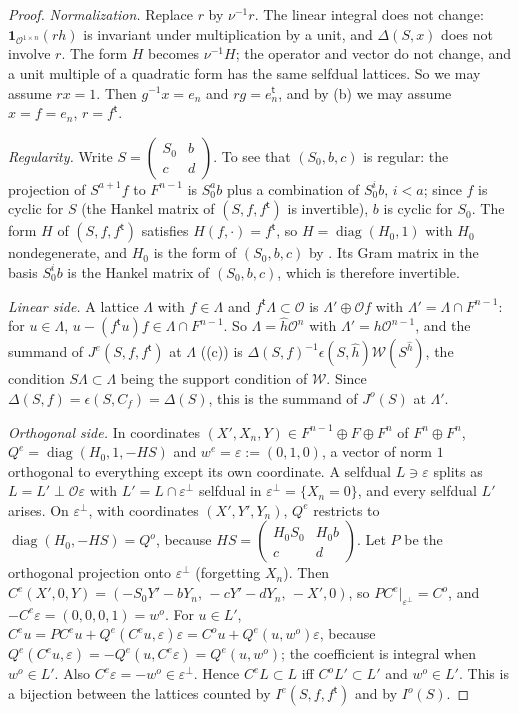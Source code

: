 \documentclass[11pt,oneside,notitlepage]{book}
\numberwithin{equation}{section}
\theoremstyle{plain}
\theoremstyle{definition}
\newcommand{\cO}{\mathcal{O}}
\newcommand{\cW}{\mathcal{W}}
\newcommand{\diag}{\operatorname{diag}}
\newcommand{\one}{\mathbf{1}}
\begin{document}
\begin{proof}
\emph{Normalization.} Replace $r$ by $\nu^{-1}r$. The linear integral does not change: $\one_{\cO^{1\times n}}(rh)$ is invariant under multiplication by a unit, and $\Delta(S,x)$ does not involve $r$. The form $H$ becomes $\nu^{-1}H$; the operator and vector do not change, and a unit multiple of a quadratic form has the same selfdual lattices. So we may assume $rx=1$. Then $g^{-1}x=e_n$ and $rg=e_n^{\mathsf t}$, and by (b) we may assume $x=f=e_n$, $r=f^{\mathsf t}$.

\emph{Regularity.} Write $S=\left(\begin{smallmatrix}S_0&b\\c&d\end{smallmatrix}\right)$. To see that $(S_0,b,c)$ is regular: the projection of $S^{a+1}f$ to $F^{n-1}$ is $S_0^ab$ plus a combination of $S_0^ib$, $i<a$; since $f$ is cyclic for $S$ (the Hankel matrix of $(S,f,f^{\mathsf t})$ is invertible), $b$ is cyclic for $S_0$. The form $H$ of $(S,f,f^{\mathsf t})$ satisfies $H(f,\cdot)=f^{\mathsf t}$, so $H=\diag(H_0,1)$ with $H_0$ nondegenerate, and $H_0$ is the form of $(S_0,b,c)$ by . Its Gram matrix in the basis $S_0^ib$ is the Hankel matrix of $(S_0,b,c)$, which is therefore invertible.

\emph{Linear side.} A lattice $\Lambda$ with $f\in\Lambda$ and $f^{\mathsf t}\Lambda\subset\cO$ is $\Lambda'\oplus\cO f$ with $\Lambda'=\Lambda\cap F^{n-1}$: for $u\in\Lambda$, $u-(f^{\mathsf t}u)f\in\Lambda\cap F^{n-1}$. So $\Lambda=\hat h\cO^n$ with $\Lambda'=h\cO^{n-1}$, and the summand of $J^e(S,f,f^{\mathsf t})$ at $\Lambda$ ((c)) is $\Delta(S,f)^{-1}\epsilon(S,\hat h)\cW(S^{\hat h})$, the condition $S\Lambda\subset\Lambda$ being the support condition of $\cW$. Since $\Delta(S,f)=\epsilon(S,C_f)=\Delta(S)$, this is the summand of $J^o(S)$ at $\Lambda'$.

\emph{Orthogonal side.} In coordinates $(X',X_n,Y)\in F^{n-1}\oplus F\oplus F^n$ of $F^n\oplus F^n$, $Q^e=\diag(H_0,1,-HS)$ and $w^e=\varepsilon:=(0,1,0)$, a vector of norm $1$ orthogonal to everything except its own coordinate. A selfdual $L\ni\varepsilon$ splits as $L=L'\perp\cO\varepsilon$ with $L'=L\cap\varepsilon^\perp$ selfdual in $\varepsilon^\perp=\{X_n=0\}$, and every selfdual $L'$ arises. On $\varepsilon^\perp$, with coordinates $(X',Y',Y_n)$, $Q^e$ restricts to $\diag(H_0,-HS)=Q^o$, because $HS=\left(\begin{smallmatrix}H_0S_0&H_0b\\c&d\end{smallmatrix}\right)$. Let $P$ be the orthogonal projection onto $\varepsilon^\perp$ (forgetting $X_n$). Then $C^e(X',0,Y)=(-S_0Y'-bY_n,\,-cY'-dY_n,\,-X',0)$, so $PC^e|_{\varepsilon^\perp}=C^o$, and $-C^e\varepsilon=(0,0,0,1)=w^o$. For $u\in L'$, $C^eu=PC^eu+Q^e(C^eu,\varepsilon)\varepsilon=C^ou+Q^e(u,w^o)\varepsilon$, because $Q^e(C^eu,\varepsilon)=-Q^e(u,C^e\varepsilon)=Q^e(u,w^o)$; the coefficient is integral when $w^o\in L'$. Also $C^e\varepsilon=-w^o\in\varepsilon^\perp$. Hence $C^eL\subset L$ iff $C^oL'\subset L'$ and $w^o\in L'$. This is a bijection between the lattices counted by $I^e(S,f,f^{\mathsf t})$ and by $I^o(S)$.
\end{proof}
\end{document}
